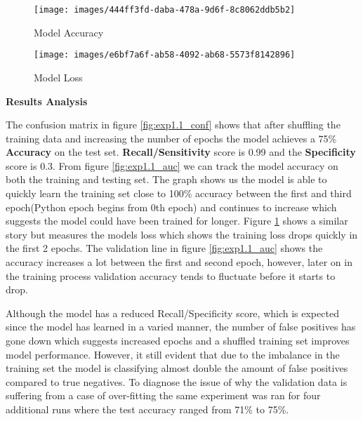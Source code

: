 \begin{figure}[H]
	\begin{minipage}[t]{7.2cm}
		\begin{center}
			\texttt{[image: images/444ff3fd-daba-478a-9d6f-8c8062ddb5b2]}
			\caption{Model Accuracy}
			\label{fig:exp1.1_auc}
		\end{center}
	\end{minipage}
	\hfill
	\begin{minipage}[t]{7.2cm}
		\begin{center}
			\texttt{[image: images/e6bf7a6f-ab58-4092-ab68-5573f8142896]}
			\caption{Model Loss}
			\label{fig:exp1.1_loss}
		\end{center}
	\end{minipage}
\end{figure}


\textbf{Results Analysis}


The confusion matrix in figure \ref{fig:exp1.1_conf} shows that after shuffling the training data and increasing the number of epochs the model achieves a 75\% \textbf{Accuracy} on the test set. \textbf{Recall/Sensitivity} score is 0.99 and the \textbf{Specificity} score is 0.3. From figure \ref{fig:exp1.1_auc} we can track the model accuracy on both the training and testing set. The graph shows us the model is able to quickly learn the training set close to 100\% accuracy between the first and third epoch(Python epoch begins from 0th epoch) and continues to increase which suggests the model could have been trained for longer. Figure \ref{fig:exp1.1_loss} shows a similar story but measures the models loss which shows the training loss drops quickly in the first 2 epochs. The validation line in figure \ref{fig:exp1.1_auc} shows the accuracy increases a lot between the first and second epoch, however, later on in the training process validation accuracy tends to fluctuate before it starts to drop. 


Although the model has a reduced Recall/Specificity score, which is expected since the model has learned in a varied manner, the number of false positives has gone down which suggests increased epochs and a shuffled training set improves model performance. However, it still evident that due to the imbalance in the training set the model is classifying almost double the amount of false positives compared to true negatives. To diagnose the issue of why the validation data is suffering from a case of over-fitting the same experiment was ran for four additional runs where the test accuracy ranged from 71\% to 75\%. 

